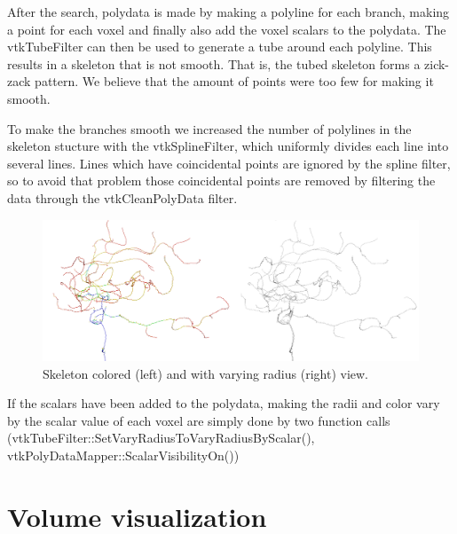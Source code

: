After the search, polydata is made by making a polyline for each branch, making a point for each voxel and finally also add the voxel scalars to the polydata. The vtkTubeFilter can then be used to generate a tube around each polyline. This results in a skeleton that is not smooth. That is, the tubed skeleton forms a zick-zack pattern. We believe that the amount of points were too few for making it smooth.

To make the branches smooth we increased the number of polylines in the skeleton stucture with the vtkSplineFilter, which uniformly divides each line into several lines. Lines which have coincidental points are ignored by the spline filter, so to avoid that problem those coincidental points are removed by filtering the data through the vtkCleanPolyData filter.


\begin{figure}
	\centering
	\includegraphics[scale=0.35]{fig/skeleton-colored-radius}
	\caption{Skeleton colored (left) and with varying radius (right) view.}\label{fig:skeleton-colored-radius}
\end{figure}

If the scalars have been added to the polydata, making the radii and color vary by the scalar value of each voxel are simply done by two function calls (vtkTubeFilter::SetVaryRadiusToVaryRadiusByScalar(), vtkPolyDataMapper::ScalarVisibilityOn())

\section{Volume visualization}

